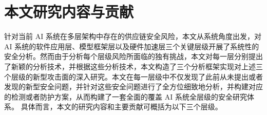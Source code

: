 


\section{本文研究内容与贡献}
针对当前 AI 系统在多层架构中存在的供应链安全风险，本文从系统角度出发，对 AI 系统的软件应用层、模型框架层以及硬件加速层三个关键层级开展了系统性的安全分析。然而由于分析每个层级风险所面临的独有挑战，本文对每一层分别提出了新颖的分析技术，并根据这些分析技术，本文构造了三个分析框架实现对上述三个层级的新型攻击面的深入研究。本文在每一层级中不仅发现了此前从未提出或者发现的新型安全问题，并针对这些安全问题进行了全方位细致地分析，并构建对应的检测或者防护方案，从而构建了一套全面的覆盖 AI 系统全层级的安全研究体系。
具体而言，本文的研究内容和主要贡献可概括为以下三个层级。

